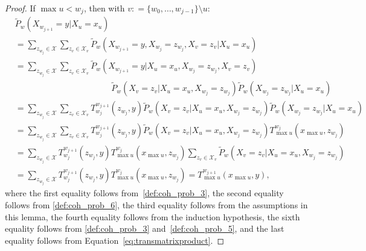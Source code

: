 \documentclass[10pt,a4paper]{paper}
\theoremstyle{definition}
\newcommand{\states}{\mathcal{X}}
\newcommand{\coloneqq}{:\!=}
\begin{document}
\begin{proof}
If $\max u<w_j$, then with $v\coloneqq\{w_0,\dots,w_{j-1}\}\setminus u$:
\begin{align*}
&\tilde{P}_w(X_{w_{j+1}}=y\vert X_u=x_u)\\[1,5mm]
&=\sum_{z_{w_j}\in\states}
\sum_{z_{v}\in\states_{v}}
\tilde{P}_w(X_{w_{j+1}}=y, X_{w_j}=z_{w_j}, X_v=z_v\vert X_u=x_u)\\
&=\sum_{z_{w_j}\in\states}
\sum_{z_{v}\in\states_{v}}
\tilde{P}_w(X_{w_{j+1}}=y\vert X_u=x_u, X_{w_j}=z_{w_j}, X_v=z_v)\\[-4mm]
&\quad\quad\quad\quad\quad\quad\quad\quad\quad\quad\quad~\,
\tilde{P}_w(X_v=z_v\vert X_u=x_u, X_{w_j}=z_{w_j})
\tilde{P}_w(X_{w_j}=z_{w_j}\vert X_u=x_u)\\[4mm]
&=\sum_{z_{w_j}\in\states}
\sum_{z_{v}\in\states_{v}}
T_{w_j}^{w_{j+1}}(z_{w_j},y)
\tilde{P}_w(X_v=z_v\vert X_u=x_u, X_{w_j}=z_{w_j})
\tilde{P}_w(X_{w_j}=z_{w_j}\vert X_u=x_u)\\
&=\sum_{z_{w_j}\in\states}
\sum_{z_{v}\in\states_{v}}
T_{w_j}^{w_{j+1}}(z_{w_j},y)
\tilde{P}_w(X_v=z_v\vert X_u=x_u, X_{w_j}=z_{w_j})
T_{\max u}^{w_{j}}(x_{\max u},z_{w_j})\\
&=\sum_{z_{w_j}\in\states}
T_{w_j}^{w_{j+1}}(z_{w_j},y)
T_{\max u}^{w_{j}}(x_{\max u},z_{w_j})
\sum_{z_{v}\in\states_{v}}
\tilde{P}_w(X_v=z_v\vert X_u=x_u, X_{w_j}=z_{w_j})
\\
&=\sum_{z_{w_j}\in\states}
T_{w_j}^{w_{j+1}}(z_{w_j},y)
T_{\max u}^{w_{j}}(x_{\max u},z_{w_j})
=T_{\max u}^{w_{j+1}}(x_{\max u},y),
\end{align*}
where the first equality follows from~\ref{def:coh_prob_3}, the second equality follows from \ref{def:coh_prob_6}, the third equality follows from the assumptions in this lemma, the fourth equality follows from the induction hypothesis, the sixth equality follows from \ref{def:coh_prob_3} and~\ref{def:coh_prob_5}, and the last equality follows from Equation~\eqref{eq:transmatrixproduct}.
\end{proof}
\end{document}
